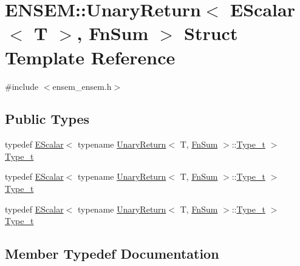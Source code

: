 \hypertarget{structENSEM_1_1UnaryReturn_3_01EScalar_3_01T_01_4_00_01FnSum_01_4}{}\section{E\+N\+S\+EM\+:\+:Unary\+Return$<$ E\+Scalar$<$ T $>$, Fn\+Sum $>$ Struct Template Reference}
\label{structENSEM_1_1UnaryReturn_3_01EScalar_3_01T_01_4_00_01FnSum_01_4}


{\ttfamily \#include $<$ensem\+\_\+ensem.\+h$>$}

\subsection*{Public Types}
\begin{DoxyCompactItemize}
\item 
typedef \mbox{\hyperlink{classENSEM_1_1EScalar}{E\+Scalar}}$<$ typename \mbox{\hyperlink{structENSEM_1_1UnaryReturn}{Unary\+Return}}$<$ T, \mbox{\hyperlink{structENSEM_1_1FnSum}{Fn\+Sum}} $>$\+::\mbox{\hyperlink{structENSEM_1_1UnaryReturn_3_01EScalar_3_01T_01_4_00_01FnSum_01_4_af4e59c889efbb46ce21a3b03bb7c9b9e}{Type\+\_\+t}} $>$ \mbox{\hyperlink{structENSEM_1_1UnaryReturn_3_01EScalar_3_01T_01_4_00_01FnSum_01_4_af4e59c889efbb46ce21a3b03bb7c9b9e}{Type\+\_\+t}}
\item 
typedef \mbox{\hyperlink{classENSEM_1_1EScalar}{E\+Scalar}}$<$ typename \mbox{\hyperlink{structENSEM_1_1UnaryReturn}{Unary\+Return}}$<$ T, \mbox{\hyperlink{structENSEM_1_1FnSum}{Fn\+Sum}} $>$\+::\mbox{\hyperlink{structENSEM_1_1UnaryReturn_3_01EScalar_3_01T_01_4_00_01FnSum_01_4_af4e59c889efbb46ce21a3b03bb7c9b9e}{Type\+\_\+t}} $>$ \mbox{\hyperlink{structENSEM_1_1UnaryReturn_3_01EScalar_3_01T_01_4_00_01FnSum_01_4_af4e59c889efbb46ce21a3b03bb7c9b9e}{Type\+\_\+t}}
\item 
typedef \mbox{\hyperlink{classENSEM_1_1EScalar}{E\+Scalar}}$<$ typename \mbox{\hyperlink{structENSEM_1_1UnaryReturn}{Unary\+Return}}$<$ T, \mbox{\hyperlink{structENSEM_1_1FnSum}{Fn\+Sum}} $>$\+::\mbox{\hyperlink{structENSEM_1_1UnaryReturn_3_01EScalar_3_01T_01_4_00_01FnSum_01_4_af4e59c889efbb46ce21a3b03bb7c9b9e}{Type\+\_\+t}} $>$ \mbox{\hyperlink{structENSEM_1_1UnaryReturn_3_01EScalar_3_01T_01_4_00_01FnSum_01_4_af4e59c889efbb46ce21a3b03bb7c9b9e}{Type\+\_\+t}}
\end{DoxyCompactItemize}


\subsection{Member Typedef Documentation}
\mbox{\label{structENSEM_1_1UnaryReturn_3_01EScalar_3_01T_01_4_00_01FnSum_01_4_af4e59c889efbb46ce21a3b03bb7c9b9e}} 
